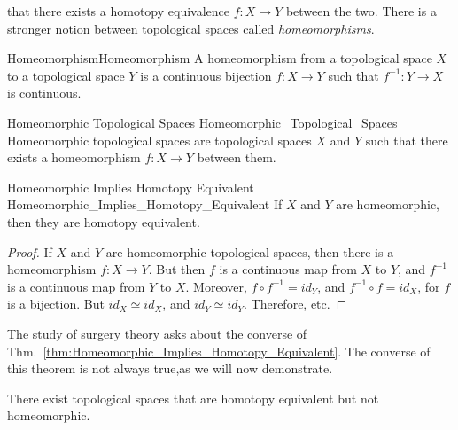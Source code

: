 \documentclass[crop=false,class=book,oneside]{standalone}                      %
\begin{document}
            that there exists a homotopy equivalence $f:X\rightarrow{Y}$
            between the two. There is a stronger notion between topological
            spaces called \textit{homeomorphisms}.
            \begin{ldefinition}{Homeomorphism}{Homeomorphism}
                A homeomorphism from a topological space $X$ to a topological
                space $Y$ is a continuous bijection $f:{X}\rightarrow{Y}$ such
                that $f^{-1}:{Y}\rightarrow{X}$ is continuous.
            \end{ldefinition}
            \begin{ldefinition}{Homeomorphic Topological Spaces}
                               {Homeomorphic_Topological_Spaces}
                Homeomorphic topological spaces are topological spaces $X$
                and $Y$ such that there exists a homeomorphism
                $f:{X}\rightarrow{Y}$ between them.
            \end{ldefinition}
            \begin{ltheorem}{Homeomorphic Implies Homotopy Equivalent}
                            {Homeomorphic_Implies_Homotopy_Equivalent}
                If $X$ and $Y$ are homeomorphic,
                then they are homotopy equivalent.
            \end{ltheorem}
            \begin{proof}
                If $X$ and $Y$ are homeomorphic topological spaces, then there
                is a homeomorphism $f:X\rightarrow Y$. But then $f$ is a
                continuous map from $X$ to $Y$, and $f^{-1}$ is a continuous
                map from $Y$ to $X$. Moreover, ${f}\circ{f^{-1}}=id_{Y}$, and
                ${f^{-1}}\circ{f}=id_{X}$, for $f$ is a bijection. But
                ${id_{X}}\simeq{id_{X}}$, and ${id_{Y}}\simeq{id_{Y}}$.
                Therefore, etc.
            \end{proof}
            The study of surgery theory asks about the
            converse of Thm.~\ref{thm:Homeomorphic_Implies_Homotopy_Equivalent}.
            The converse of this theorem is not always true,as we will now
            demonstrate.
            \begin{theorem}
                \label{thm:homotopic_does_not_imply_homeomorphic}%
                There exist topological spaces that are
                homotopy equivalent but not homeomorphic.
            \end{theorem}
\end{document}
